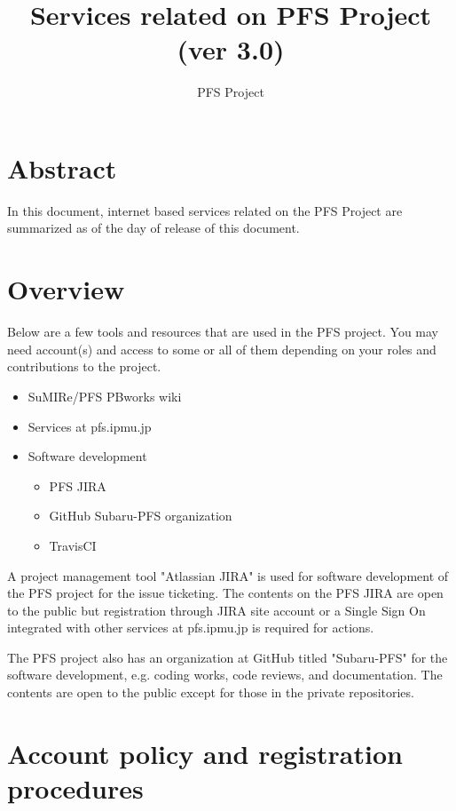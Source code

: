 \documentclass[a4paper,notitlepage]{article}
\title{Services related on PFS Project (ver 3.0)}
\author{PFS Project}
\begin{document}
\maketitle
\tableofcontents

\section{Abstract}

In this document, internet based services related on the PFS Project are summarized 
as of the day of release of this document. 

\section{Overview}

Below are a few tools and resources that are used in the PFS project. 
You may need account(s) and access to some or all of them depending on your 
roles and contributions to the project. 

\begin{itemize}
  \item SuMIRe/PFS PBworks wiki
  \item Services at pfs.ipmu.jp
  \item Software development
    \begin{itemize}
      \item PFS JIRA
      \item GitHub Subaru-PFS organization
      \item TravisCI
    \end{itemize}
\end{itemize}

A project management tool "Atlassian JIRA" is used for software development 
of the PFS project for the issue ticketing. The contents on the PFS JIRA 
are open to the public but registration through JIRA site account or a Single 
Sign On integrated with other services at pfs.ipmu.jp is required for actions. 

The PFS project also has an organization at GitHub titled "Subaru-PFS" for 
the software development, e.g. coding works, code reviews, and documentation. 
The contents are open to the public except for those in the private 
repositories. 

\section{Account policy and registration procedures}
\end{document}
